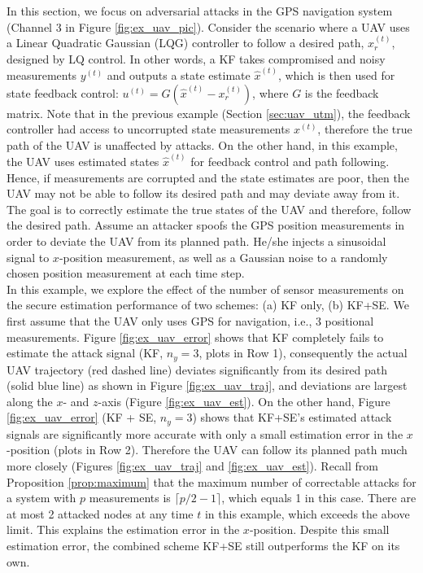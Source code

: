 \documentclass[../../thesis.tex]{subfiles}
\begin{document}
In this section, we focus on adversarial attacks in the GPS navigation system (Channel 3 in Figure \ref{fig:ex_uav_pic}). Consider the scenario where a UAV uses a Linear Quadratic Gaussian (LQG) controller to follow a desired path, $x_r^{(t)}$, designed by LQ control. In other words, a KF takes compromised and noisy measurements $y^{(t)}$ and outputs a state estimate $\hat x^{(t)}$, which is then used for state feedback control: $u^{(t)} = G (\hat x^{(t)} - x_r^{(t)})$, where $G$ is the feedback matrix. Note that in the previous example (Section \ref{sec:uav_utm}), the feedback controller had access to uncorrupted state measurements $x^{(t)}$, therefore the true path of the UAV is unaffected by attacks. On the other hand, in this example, the UAV uses estimated states $\hat x^{(t)}$ for feedback control and path following. Hence, if measurements are corrupted and the state estimates are poor, then the UAV may not be able to follow its desired path and may deviate away from it. The goal is to correctly estimate the true states of the UAV and therefore, follow the desired path. Assume an attacker spoofs the GPS position measurements in order to deviate the UAV from its planned path. He/she injects a sinusoidal signal to $x$-position measurement, as well as a Gaussian noise to a randomly chosen position measurement at each time step. 
\\
In this example, we explore the effect of the number of sensor measurements on the secure estimation performance of two schemes: (a) KF only, (b) KF+SE.
We first assume that the UAV only uses GPS for navigation, i.e., 3 positional measurements. 
Figure \ref{fig:ex_uav_error} shows that KF completely fails to estimate the attack signal (KF, $n_y = 3$, plots in Row 1), %
consequently the actual UAV trajectory (red dashed line)  deviates significantly from its desired path (solid blue line) as shown in Figure \ref{fig:ex_uav_traj}, and deviations are largest along the $x$- and $z$-axis (Figure \ref{fig:ex_uav_est}).
On the other hand, Figure \ref{fig:ex_uav_error} (KF + SE, $n_y = 3$) shows that KF+SE's estimated attack signals are significantly more accurate with only a small estimation error in the $x$-position (plots in Row 2). 
Therefore the UAV can follow its planned path much more closely (Figures \ref{fig:ex_uav_traj}  and \ref{fig:ex_uav_est}).
Recall from Proposition \ref{prop:maximum} that the maximum number of correctable attacks for a system with $p$ measurements is $\lceil p/2-1 \rceil$, which equals 1 in this case. There are at most 2 attacked nodes at any time $t$ in this example, which exceeds the above limit. This explains the estimation error in the $x$-position. Despite this small estimation error, the combined scheme KF+SE still outperforms the KF on its own.
\end{document}
